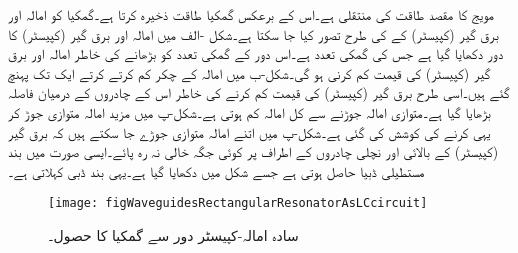 مویج کا مقصد طاقت کی منتقلی ہے۔اس کے برعکس گمکیا طاقت ذخیرہ کرتا ہے۔گمکیا کو امالہ اور برق گیر (کپیسٹر)  کے  کی طرح تصور کیا جا سکتا ہے۔شکل -الف میں امالہ اور برق گیر (کپیسٹر)  کا دور  دکھایا گیا ہے  جس کی گمکی تعدد  ہے۔اس دور کے گمکی تعدد کو بڑھانے کی خاطر امالہ اور برق گیر (کپیسٹر)  کی قیمت کم کرنی ہو گی۔شکل-ب میں امالہ کے چکر کم کرتے کرتے ایک تک پہنچ گئے ہیں۔اسی طرح برق گیر (کپیسٹر)  کی قیمت کم کرنے کی خاطر اس کے چادروں کے درمیان فاصلہ بڑھایا گیا ہے۔متوازی امالہ جوڑنے سے کل امالہ کم ہوتی ہے۔شکل-پ میں مزید امالہ متوازی جوڑ کر یہی کرنے کی کوشش کی گئی ہے۔شکل-پ میں اتنے امالہ متوازی جوڑے جا سکتے ہیں کہ برق گیر (کپیسٹر)  کے بالائی اور نچلی چادروں کے اطراف پر کوئی جگہ خالی نہ رہ پائے۔ایسی صورت میں بند مستطیلی ڈبیا حاصل ہوتی ہے جسے شکل  میں دکھایا گیا ہے۔یہی بند ڈبی   کہلاتی ہے۔ 

\begin{figure}
\centering
\texttt{[image: figWaveguidesRectangularResonatorAsLCcircuit]}
\caption{سادہ امالہ-کپیسٹر دور سے گمکیا کا حصول۔}
\label{شکل_مویج_امالہ_کپیسٹر_سے_گمکیا}
\end{figure}

